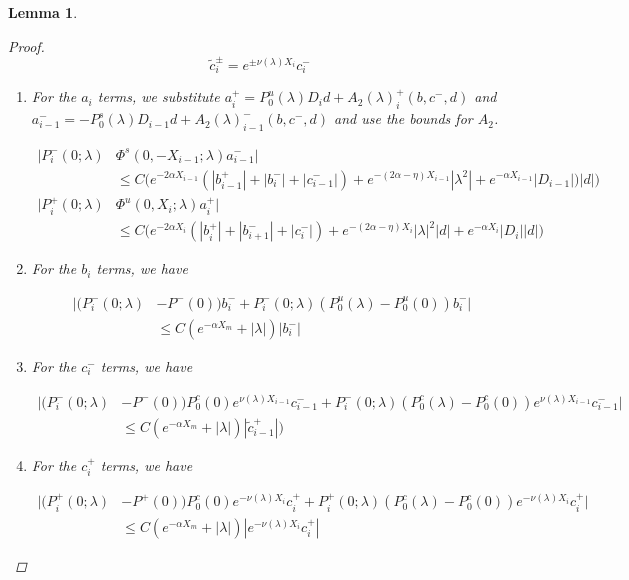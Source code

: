 \documentclass[12pt]{article}
\newtheorem{lemma}{Lemma}
\begin{document}
\begin{lemma}
\begin{proof}
\[
\tilde{c}_i^\pm = e^{\pm \nu(\lambda) X_i} c_i^-
\]

\begin{enumerate}

\item For the $a_i$ terms, we substitute $a_i^+ = P_0^u(\lambda) D_i d + A_2(\lambda)_i^+(b, c^-, d)$ and $a_{i-1}^- = -P_0^s(\lambda) D_{i-1} d + A_2(\lambda)_{i-1}^-(b, c^-, d)$ and use the bounds for $A_2$.

\begin{align*}
|P_i^-(0; \lambda) &\Phi^s(0, -X_{i-1}; \lambda) a_{i-1}^-| \\
&\leq C \Big( e^{-2 \alpha X_{i-1}} (|b_{i-1}^+| + |b_i^-| + |c_{i-1}^-|) + e^{-(2 \alpha - \eta) X_{i-1}} |\lambda^2| + e^{-\alpha X_{i-1}}|D_{i-1}|)|d| \Big) \\
|P_i^+(0; \lambda) &\Phi^u(0, X_i; \lambda) a_i^+| \\
&\leq C \Big( e^{-2 \alpha X_i} (|b_i^+| + |b_{i+1}^-| + |c_i^-|) + e^{-(2 \alpha - \eta) X_i} |\lambda|^2|d| + e^{-\alpha X_i} |D_i||d| \Big)
\end{align*}

\item For the $b_i$ terms, we have

\begin{align*}
|(P_i^-(0; \lambda) &- P^-(0))b_i^- + P_i^-(0; \lambda)(P_0^u(\lambda) - P_0^u(0))b_i^-| \\
&\leq C ( e^{-\alpha X_m} + |\lambda|)|b_i^-|
\end{align*}

\item For the $c_i^-$ terms, we have

\begin{align*}
|(P_i^-(0; \lambda) &- P^-(0)) P_0^c(0) e^{\nu(\lambda) X_{i-1}} c_{i-1}^- + P_i^-(0; \lambda) (P_0^c(\lambda) - P_0^c(0)) e^{\nu(\lambda) X_{i-1}} c_{i-1}^- | \\
&\leq C (e^{-\alpha X_m} + |\lambda|)|\tilde{c}_{i-1}^+|)
\end{align*}

\item For the $c_i^+$ terms, we have

\begin{align*}
|(P_i^+(0; \lambda) &- P^+(0))P_0^c(0) e^{-\nu(\lambda)X_i} c_i^+ + P_i^+(0; \lambda) (P_0^c(\lambda) - P_0^c(0)) e^{-\nu(\lambda)X_i} c_i^+| \\
&\leq C (e^{-\alpha X_m} + |\lambda|)|e^{-\nu(\lambda)X_i} c_i^+|
\end{align*}


\end{enumerate}
\end{proof}
\end{lemma}
\end{document}
